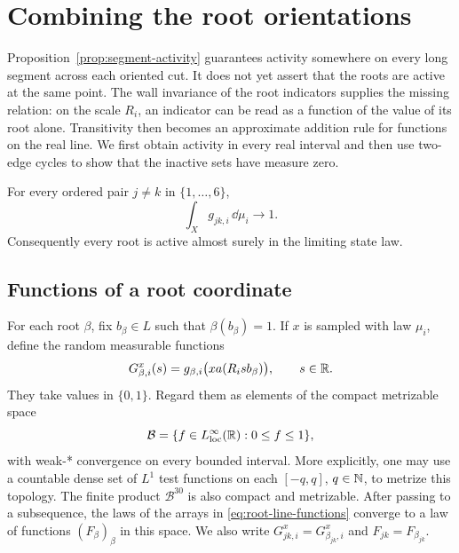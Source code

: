 \section{Combining the root orientations}\label{sec:combination}

Proposition~\ref{prop:segment-activity} guarantees activity somewhere on
every long segment across each oriented cut.  It does not yet assert that
the roots are active at the same point.  The wall invariance of the root
indicators supplies the missing relation: on the scale $R_i$, an indicator
can be read as a function of the value of its root alone.  Transitivity
then becomes an approximate addition rule for functions on the real line.
We first obtain activity in every real interval and then use two-edge
cycles to show that the inactive sets have measure zero.

\begin{theorem}\label{thm:full-activity}
For every ordered pair $j\ne k$ in $\{1,\ldots,6\}$,
\begin{equation}\label{eq:full-activity}
 \int_X g_{jk,i}\,\dd\mu_i\longrightarrow1.
\end{equation}
Consequently every root is active almost surely in the limiting state law.
\end{theorem}

\subsection{Functions of a root coordinate}

For each root $\beta$, fix $b_\beta\in L$ such that
$\beta(b_\beta)=1$.  If $x$ is sampled with law $\mu_i$, define the random
measurable functions
\begin{equation}\label{eq:root-line-functions}
 G_{\beta,i}^{x}(s)=g_{\beta,i}\bigl(xa(R_i s b_\beta)\bigr),
 \qquad s\in\mathbb R.
\end{equation}
They take values in $\{0,1\}$.  Regard them as elements of the compact
metrizable space
\[
 \mathcal B=\{f\in L^\infty_{\mathrm{loc}}(\mathbb R):0\leq f\leq1\},
\]
with weak-* convergence on every bounded interval.  More explicitly,
one may use a countable dense set of $L^1$ test functions on each
$[-q,q]$, $q\in\mathbb N$, to metrize this topology.  The finite product
$\mathcal B^{30}$ is also compact and metrizable.  After passing to a
subsequence, the laws of the arrays in \eqref{eq:root-line-functions}
converge to a law of functions $(F_\beta)_\beta$ in this space.
We also write $G_{jk,i}^{x}=G_{\beta_{jk},i}^{x}$ and
$F_{jk}=F_{\beta_{jk}}$.

